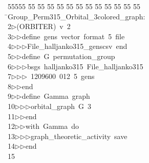 %
%
\begin{tabbing}
55555 \= 55 \= 55 \= 55 \= 55 \= 55 \= 55 \= 55 \= 55 \= 55 \= 55 \= 55 \= 55 \= \>Group\_Perm315\_Orbital\_3colored\_graph:\\[0pt]
2\>$\triangleright$\>(ORBITER)\ v\ 2\ \\[0pt]
3\>$\triangleright$\>$\triangleright$\>define\ gens\ vector\ format\ 5\ file\ \\[0pt]
4\>$\triangleright$\>$\triangleright$\>$\triangleright$\>File\_halljanko315\_genscsv\ end\ \\[0pt]
5\>$\triangleright$\>$\triangleright$\>define\ G\ permutation\_group\ \\[0pt]
6\>$\triangleright$\>$\triangleright$\>$\triangleright$\>bsgs\ halljanko315\ File\_halljanko315\ \\[0pt]
7\>$\triangleright$\>$\triangleright$\>$\triangleright$\ 1209600\ 012\ 5\ gens\ \\[0pt]
8\>$\triangleright$\>$\triangleright$\>end\ \\[0pt]
9\>$\triangleright$\>$\triangleright$\>define\ Gamma\ graph\ \\[0pt]
10\>$\triangleright$\>$\triangleright$\>$\triangleright$\>orbital\_graph\ G\ 3\ \\[0pt]
11\>$\triangleright$\>$\triangleright$\>end\ \\[0pt]
12\>$\triangleright$\>$\triangleright$\>with\ Gamma\ do\ \\[0pt]
13\>$\triangleright$\>$\triangleright$\>$\triangleright$\>graph\_theoretic\_activity\ save\ \\[0pt]
14\>$\triangleright$\>$\triangleright$\>end\\[0pt]
15\>\end{tabbing}
